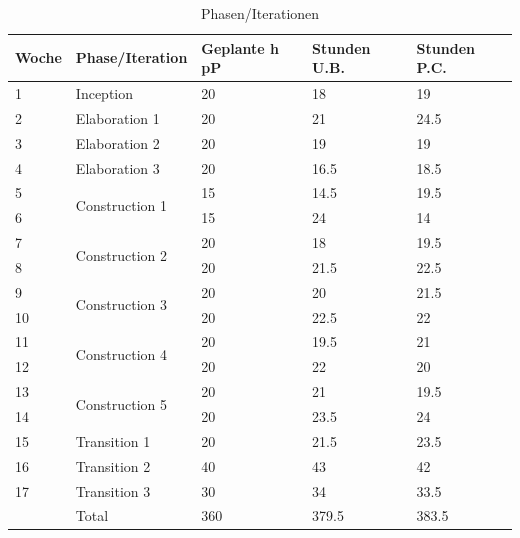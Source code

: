 \begin{table}[H]
    \centering
    \caption{Phasen/Iterationen}
    \label{tab:phases}
    \begin{tabular}{| l | l | l | l | l |}
        \toprule
        Woche & Phase/Iteration & Geplante h pP & Stunden U.B. & Stunden P.C.  \\
        \midrule
        1     & Inception                       & 20   &    18    &  19     \\
        2     & Elaboration 1                   & 20   &    21    &  24.5   \\
        3     & Elaboration 2                   & 20   &    19    &  19     \\
        4     & Elaboration 3                   & 20   &    16.5  &  18.5   \\
        5     & \multirow{2}{*}{Construction 1} & 15   &    14.5  &  19.5   \\
        6     &                                 & 15   &    24    &  14     \\
        7     & \multirow{2}{*}{Construction 2} & 20   &    18    &  19.5   \\
        8     &                                 & 20   &    21.5  &  22.5   \\
        9     & \multirow{2}{*}{Construction 3} & 20   &    20    &  21.5   \\
        10    &                                 & 20   &    22.5  &  22     \\
        11    & \multirow{2}{*}{Construction 4} & 20   &    19.5  &  21     \\
        12    &                                 & 20   &    22    &  20     \\
        13    & \multirow{2}{*}{Construction 5} & 20   &    21    &  19.5   \\
        14    &                                 & 20   &    23.5  &  24     \\
        15    & Transition 1                    & 20   &    21.5  &  23.5   \\
        16    & Transition 2                    & 40   &    43    &  42     \\
        17    & Transition 3                    & 30   &    34    &  33.5   \\
              & Total                           & 360  &    379.5 & 383.5   \\
        \bottomrule
    \end{tabular}
\end{table}


